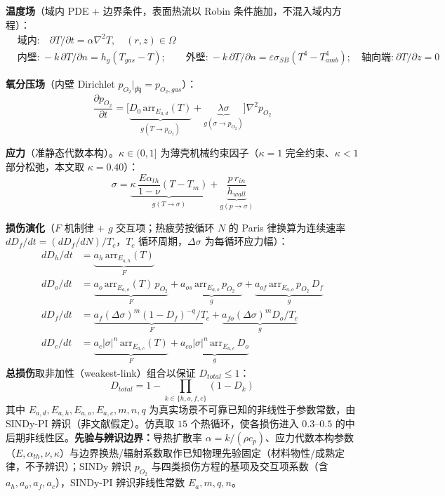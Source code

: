 \documentclass[11pt,a4paper]{article}
\begin{document}
\textbf{温度场}（域内 PDE + 边界条件，表面热流以 Robin 条件施加，不混入域内方程）：
\begin{align*}
&\text{域内:}\quad \partial T/\partial t=\alpha\nabla^2 T,\quad (r,z)\in\Omega\\
&\text{内壁:}\ -k\,\partial T/\partial n=h_g(T_{gas}-T);\qquad
 \text{外壁:}\ -k\,\partial T/\partial n=\varepsilon\sigma_{SB}(T^4-T_{amb}^4);\quad
 \text{轴向端:}\ \partial T/\partial z=0
\end{align*}

\textbf{氧分压场}（内壁 Dirichlet $p_{O_2}|_\text{内}=p_{O_2,gas}$）：
\begin{equation*}
\frac{\partial p_{O_2}}{\partial t}=\big[\underbrace{D_0\,\mathrm{arr}_{E_{a,d}}(T)}_{g(T\to p_{O_2})}+\underbrace{\lambda\sigma}_{g(\sigma\to p_{O_2})}\big]\nabla^2 p_{O_2}
\end{equation*}

\textbf{应力}（准静态代数本构）。$\kappa\in(0,1]$ 为薄壳机械约束因子（$\kappa=1$ 完全约束、$\kappa<1$ 部分松弛，本文取 $\kappa=0.40$）：
\begin{equation*}
\sigma=\underbrace{\kappa\,\frac{E\alpha_{th}}{1-\nu}(T-T_m)}_{g(T\to\sigma)}+\underbrace{\frac{p\,r_{in}}{h_{wall}}}_{g(p\to\sigma)}
\end{equation*}

\textbf{损伤演化}（$F$ 机制律 + $g$ 交互项；热疲劳按循环 $N$ 的 Paris 律换算为连续速率 $dD_f/dt=(dD_f/dN)/T_c$，$T_c$ 循环周期，$\Delta\sigma$ 为每循环应力幅）：
\begin{align*}
dD_h/dt &= \underbrace{a_h\,\mathrm{arr}_{E_{a,h}}(T)}_{F}\\
dD_o/dt &= \underbrace{a_o\,\mathrm{arr}_{E_{a,o}}(T)\,p_{O_2}}_{F}+\underbrace{a_{os}\,\mathrm{arr}_{E_{a,o}}\,p_{O_2}\,\sigma}_{g}+\underbrace{a_{of}\,\mathrm{arr}_{E_{a,o}}\,p_{O_2}\,D_f}_{g}\\
dD_f/dt &= \underbrace{a_f(\Delta\sigma)^m(1-D_f)^{-q}/T_c}_{F}+\underbrace{a_{fo}(\Delta\sigma)^m D_o/T_c}_{g}\\
dD_c/dt &= \underbrace{a_c|\sigma|^n\,\mathrm{arr}_{E_{a,c}}(T)}_{F}+\underbrace{a_{co}|\sigma|^n\,\mathrm{arr}_{E_{a,c}}\,D_o}_{g}
\end{align*}
\textbf{总损伤}取非加性（weakest-link）组合以保证 $D_{total}\le 1$：
\begin{equation*}
D_{total}=1-\prod_{k\in\{h,o,f,c\}}(1-D_k)
\end{equation*}
其中 $E_{a,d},E_{a,h},E_{a,o},E_{a,c},m,n,q$ 为真实场景不可靠已知的非线性于参数常数，由 SINDy-PI 辨识（非文献假定）。仿真取 $15$ 个热循环，使各损伤进入 $0.3$–$0.5$ 的中后期非线性区。\textbf{先验与辨识边界：}导热扩散率 $\alpha=k/(\rho c_p)$、应力代数本构参数（$E,\alpha_{th},\nu,\kappa$）与边界换热/辐射系数取作已知物理先验固定（材料物性/成熟定律，不予辨识）；SINDy 辨识 $p_{O_2}$ 与四类损伤方程的基项及交互项系数（含 $a_h,a_o,a_f,a_c$），SINDy-PI 辨识非线性常数 $E_a,m,q,n$。
\end{document}
